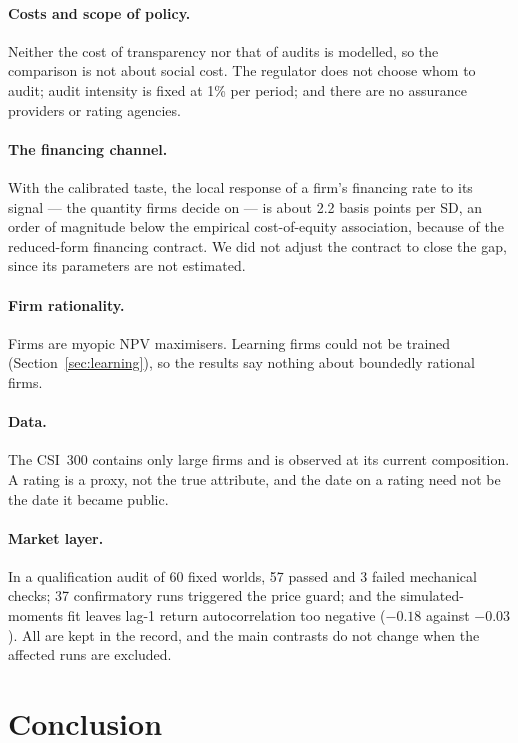 \documentclass[11pt]{article}
\begin{document}
\paragraph{Costs and scope of policy.} Neither the cost of transparency nor that of audits is modelled, so the comparison is not about social cost. The regulator does not choose whom to audit; audit intensity is fixed at 1\% per period; and there are no assurance providers or rating agencies.

\paragraph{The financing channel.} With the calibrated taste, the local response of a firm's financing rate to its signal --- the quantity firms decide on --- is about 2.2 basis points per SD, an order of magnitude below the empirical cost-of-equity association, because of the reduced-form financing contract. We did not adjust the contract to close the gap, since its parameters are not estimated.

\paragraph{Firm rationality.} Firms are myopic NPV maximisers. Learning firms could not be trained (Section~\ref{sec:learning}), so the results say nothing about boundedly rational firms.

\paragraph{Data.} The CSI~300 contains only large firms and is observed at its current composition. A rating is a proxy, not the true attribute, and the date on a rating need not be the date it became public.

\paragraph{Market layer.} In a qualification audit of 60 fixed worlds, 57 passed and 3 failed mechanical checks; 37 confirmatory runs triggered the price guard; and the simulated-moments fit leaves lag-1 return autocorrelation too negative ($-0.18$ against $-0.03$). All are kept in the record, and the main contrasts do not change when the affected runs are excluded.

\section{Conclusion}\label{sec:conclusion}
\end{document}

